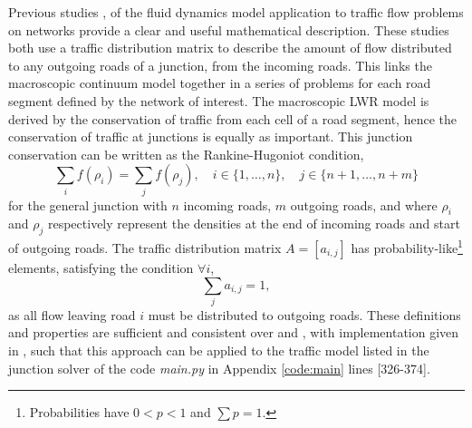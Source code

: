 	Previous studies \cite{Bretti07},\cite{ShiGuo16} of the fluid dynamics model application to traffic flow problems on networks provide a clear and useful mathematical description. These studies both use a traffic distribution matrix to describe the amount of flow distributed to any outgoing roads of a junction, from the incoming roads. This links the macroscopic continuum model together in a series of problems for each road segment defined by the network of interest. The macroscopic LWR model is derived by the conservation of traffic from each cell of a road segment, hence the conservation of traffic at junctions is equally as important. This junction conservation can be written as the Rankine-Hugoniot condition,
	\begin{equation}
		\sum_{i}f(\rho_i)=\sum_{j}f(\rho_j),\quad i\in\{1,\hdots,n\}, \quad j\in\{n+1,\hdots,n+m\}
	\end{equation}
	for the general junction with $n$ incoming roads, $m$ outgoing roads, and where $\rho_i$ and $\rho_j$ respectively represent the densities at the end of incoming roads and start of outgoing roads. The traffic distribution matrix $A=\left[a_{i,j}\right]$ has probability-like\footnote{Probabilities have $0<p<1$ and $\sum p=1$.} elements, satisfying the condition $\forall i$,
	\begin{equation}
		\sum_{j}a_{i,j}=1,
	\end{equation}
	as all flow leaving road $i$ must be distributed to outgoing roads. These definitions and properties are sufficient and consistent over \cite{Bretti07} and \cite{ShiGuo16}, with implementation given in \cite{Gcostese}, such that this approach can be applied to the traffic model listed in the junction solver of the code \emph{main.py} in Appendix \ref{code:main}  lines [326-374].